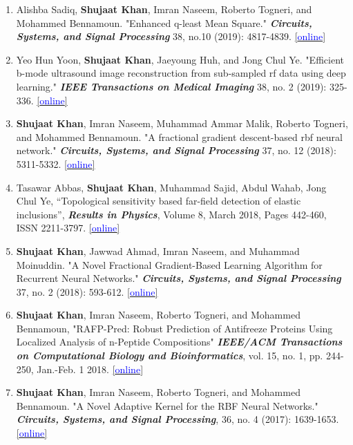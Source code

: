 \begin{enumerate}
    \item Alishba Sadiq, \textbf{Shujaat Khan}, Imran Naseem, Roberto Togneri, and Mohammed Bennamoun. "Enhanced q-least Mean Square." \textit{\textbf{Circuits, Systems, and Signal Processing}} 38, no.10 (2019): 4817-4839. \href{https://doi.org/10.1007/s00034-019-01091-4}{[\textcolor{blue}{online}]}
    
    \item Yeo Hun Yoon, \textbf{Shujaat Khan}, Jaeyoung Huh, and Jong Chul Ye. "Efficient b-mode ultrasound image reconstruction from sub-sampled rf data using deep learning." \textit{\textbf{IEEE Transactions on Medical Imaging}} 38, no. 2 (2019): 325-336. \href{https://doi.org/10.1109/TMI.2018.2864821}{[\textcolor{blue}{online}]}
    
    \item \textbf{Shujaat Khan}, Imran Naseem, Muhammad Ammar Malik, Roberto Togneri, and Mohammed Bennamoun. "A fractional gradient descent-based rbf neural network." \textit{\textbf{Circuits, Systems, and Signal Processing}} 37, no. 12 (2018): 5311-5332. \href{https://doi.org/10.1007/s00034-018-0835-3}{[\textcolor{blue}{online}]}
    
    \item Tasawar Abbas, \textbf{Shujaat Khan}, Muhammad Sajid, Abdul Wahab, Jong Chul Ye, “Topological sensitivity based far-field detection of elastic inclusions”, \textit{\textbf{Results in Physics}}, Volume 8, March 2018, Pages 442-460, ISSN 2211-3797. \href{https://doi.org/10.1016/j.rinp.2017.12.041}{[\textcolor{blue}{online}]}
    
    \item \textbf{Shujaat Khan}, Jawwad Ahmad, Imran Naseem, and Muhammad Moinuddin. "A Novel Fractional Gradient-Based Learning Algorithm for Recurrent Neural Networks." \textit{\textbf{Circuits, Systems, and Signal Processing}}  37, no. 2 (2018): 593-612. \href{https://doi.org/10.1007/s00034-017-0572-z}{[\textcolor{blue}{online}]}
    
    \item \textbf{Shujaat Khan}, Imran Naseem, Roberto Togneri, and Mohammed Bennamoun, "RAFP-Pred: Robust Prediction of Antifreeze Proteins Using Localized Analysis of n-Peptide Compositions" \textit{\textbf{IEEE/ACM Transactions on Computational Biology and Bioinformatics}}, vol. 15, no. 1, pp. 244-250, Jan.-Feb. 1 2018. \href{https://doi.org/10.1109/TCBB.2016.2617337}{[\textcolor{blue}{online}]}
    
    \item \textbf{Shujaat Khan}, Imran Naseem, Roberto Togneri, and Mohammed Bennamoun. "A Novel Adaptive Kernel for the RBF Neural Networks." \textit{\textbf{Circuits, Systems, and Signal Processing}}, 36, no. 4 (2017): 1639-1653. \href{https://doi.org/10.1007/s00034-016-0375-7}{[\textcolor{blue}{online}]}
    

\end{enumerate}
